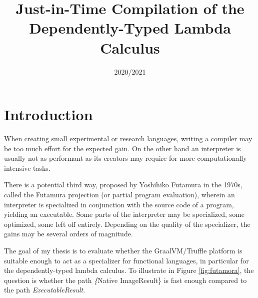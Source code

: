\documentclass{SPFIT}
\affiliation{\href{mailto:xzaryb00@stud.fit.vut.cz}{xzaryb00@stud.fit.vut.cz}, \textit{Faculty of Information Technology, Brno University of Technology}}
\date{2020/2021}
\title{Just-in-Time Compilation of the Dependently-Typed Lambda Calculus}
\begin{document}
\PPFinalCopy
\def\myauthor{Jakub Zárybnický}
\def\myabstract{%
When building a programming language, the choice is often between writing a compiler
or an interpreter, a compromise between speed and ease of implementation respectively.
Just-in-time compilation offers a compromise, interpretation combined with
gradual optimization during program runtime.
%
The goal of my goal is to investigate whether just-in-time compilation offers the
same advantages in the dependently-typed lambda calculus just as it does in imperative languages.
%
The implementation environment is the Java Virtual Machine, and in particular
the GraalVM runtime and the Truffle language implementation framework.

In the scope of this term project, I have investigated the relevant
topics of JIT compilation, dependent types, and lambda calculi. I have also
created a reference implementation of the dependently-typed lambda calculus
LambdaPi based on prior work, and started two other implementations---one
a LLVM-based compiler, and a Truffle-based JIT interpreter/compiler.

These three implementations---together with a set of benchmarks---will form
the basis of my thesis and after omtimizations, will either prove or disprove
the usefulness of JIT compilation for the dependently-typed lambda calculus.
}
\startdocument

\section{Introduction}
\label{sec:org79a9ee8}
When creating small experimental or research languages, writing a compiler may
be too much effort for the expected gain. On the other hand an interpreter is
usually not as performant as its creators may require for more computationally
intensive tasks.

There is a potential third way, proposed by Yoshihiko Futamura in the 1970s,
called the Futamura projection (or partial program evaluation), wherein an
interpreter is specialized in conjunction with the source code of a program,
yielding an executable. Some parts of the interpreter may be specialized, some
optimized, some left off entirely. Depending on the quality of the specializer,
the gains may be several orders of magnitude.

The goal of my thesis is to evaluate whether the GraalVM/Truffle platform is
suitable enough to act as a specializer for functional languages, in particular
for the dependently-typed lambda calculus.  To illustrate in Figure
\ref{fig:futamora}, the question is whether the path \textit\{Native
Image\textrightarrow Result\} is fast enough compared to the path
\textit{Executable\textrightarrow Result}.
\end{document}
